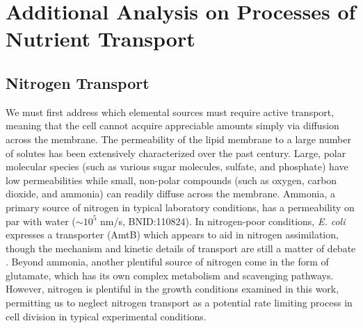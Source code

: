 \section{Additional Analysis on Processes of Nutrient Transport}
\label{sec:SI_nutr_trans}

\subsection{Nitrogen Transport}
We must first address which elemental sources must require active
transport, meaning that the cell cannot acquire appreciable amounts simply
via diffusion across the membrane. The permeability of the lipid membrane to
a large number of solutes has been extensively characterized over the past
century. Large, polar molecular species (such as various sugar molecules,
sulfate, and phosphate) have low permeabilities while small, non-polar
compounds (such as oxygen, carbon dioxide, and ammonia) can readily diffuse
across the membrane. Ammonia, a primary source of nitrogen in typical
laboratory conditions, has a permeability on par with water ($\sim 10^5$
nm/s, BNID:110824). In nitrogen-poor conditions,
\textit{E. coli} expresses a transporter (AmtB) which appears to aid in
nitrogen assimilation, though the mechanism and kinetic details of transport
are still a matter of debate \citep{heeswijk2013a, khademi2004}. Beyond
ammonia, another plentiful source of nitrogen come in the form of glutamate,
which has its own complex metabolism and scavenging pathways. However,
nitrogen is plentiful in the growth conditions examined in this work,
permitting us to neglect nitrogen transport as a potential rate limiting
process in cell division in typical experimental conditions.


